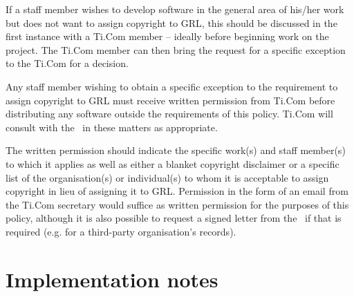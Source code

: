\documentclass[10pt,a4paper]{article}
\begin{document}
\par If a staff member wishes to develop software in the general area of his/her work 
but does not want to assign copyright to GRL, this should be discussed in the first 
instance with a Ti.Com member -- ideally before beginning work on the project. The Ti.Com 
member can then bring the request for a specific exception to the Ti.Com for a decision. 

\par Any staff member wishing to obtain a specific exception to the requirement to 
assign copyright to GRL must receive written permission from Ti.Com before 
distributing any software outside the requirements of this policy. Ti.Com will consult 
with the \exectitle\ in these matters as appropriate. 

\par The written permission should indicate the specific work(s) and staff member(s) 
to which it applies as well as either a blanket copyright disclaimer or a specific list of 
the organisation(s) or individual(s) to whom it is acceptable to assign copyright in 
lieu of assigning it to GRL. Permission in the form of an email from the Ti.Com secretary 
would suffice as written permission for the purposes of this policy, although it is also 
possible to request a signed letter from the \exectitle\ if that is required (e.g. for a 
third-party organisation's records). 





\section{Implementation notes}
\label{section:impnotes}

\end{document}
